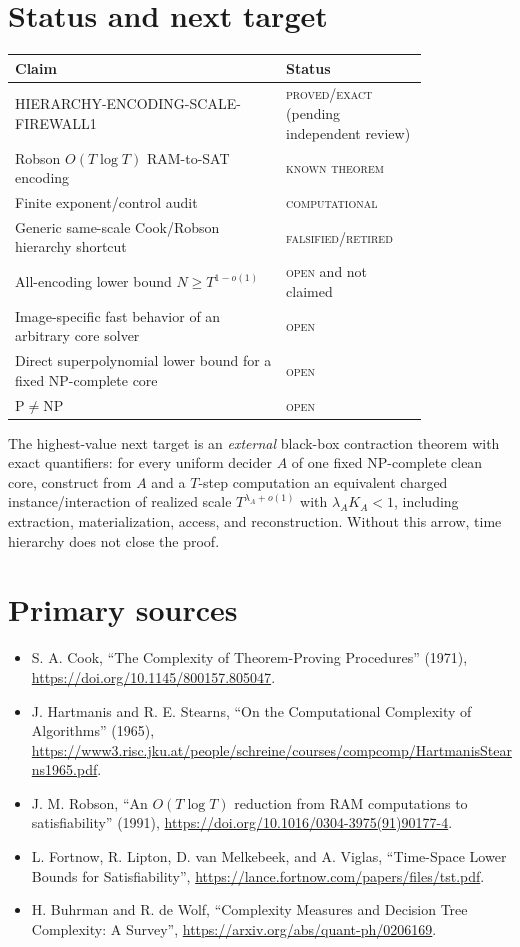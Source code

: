 \documentclass[11pt]{article}
\newcommand{\OPEN}{\textsc{open}}
\newcommand{\EXACT}{\textsc{proved/exact}}
\newcommand{\KNOWN}{\textsc{known theorem}}
\newcommand{\RET}{\textsc{falsified/retired}}
\newcommand{\COMP}{\textsc{computational}}
\begin{document}
\section{Status and next target}
\begin{center}
\begin{tabular}{p{0.55\linewidth}p{0.27\linewidth}}
\toprule
Claim & Status\\
\midrule
HIERARCHY-ENCODING-SCALE-FIREWALL1 & \EXACT{} (pending independent review)\\
Robson $O(T\log T)$ RAM-to-SAT encoding & \KNOWN{}\\
Finite exponent/control audit & \COMP{}\\
Generic same-scale Cook/Robson hierarchy shortcut & \RET{}\\
All-encoding lower bound $N\ge T^{1-o(1)}$ & \OPEN{} and not claimed\\
Image-specific fast behavior of an arbitrary core solver & \OPEN{}\\
Direct superpolynomial lower bound for a fixed NP-complete core & \OPEN{}\\
$\mathrm P\ne\mathrm{NP}$ & \OPEN{}\\
\bottomrule
\end{tabular}
\end{center}

The highest-value next target is an \emph{external} black-box contraction theorem
with exact quantifiers:
for every uniform decider $A$ of one fixed NP-complete clean core, construct from
$A$ and a $T$-step computation an equivalent charged instance/interaction of
realized scale $T^{\lambda_A+o(1)}$ with $\lambda_A K_A<1$, including extraction,
materialization, access, and reconstruction.  Without this arrow, time hierarchy
does not close the proof.

\section{Primary sources}\label{sec:sources}
\begin{itemize}[leftmargin=*]
\item S. A. Cook, ``The Complexity of Theorem-Proving Procedures'' (1971),
\url{https://doi.org/10.1145/800157.805047}.
\item J. Hartmanis and R. E. Stearns, ``On the Computational Complexity of
Algorithms'' (1965),
\url{https://www3.risc.jku.at/people/schreine/courses/compcomp/HartmanisStearns1965.pdf}.
\item J. M. Robson, ``An $O(T\log T)$ reduction from RAM computations to
satisfiability'' (1991), \url{https://doi.org/10.1016/0304-3975(91)90177-4}.
\item L. Fortnow, R. Lipton, D. van Melkebeek, and A. Viglas,
``Time-Space Lower Bounds for Satisfiability'',
\url{https://lance.fortnow.com/papers/files/tst.pdf}.
\item H. Buhrman and R. de Wolf, ``Complexity Measures and Decision Tree
Complexity: A Survey'', \url{https://arxiv.org/abs/quant-ph/0206169}.
\end{itemize}

\end{document}
